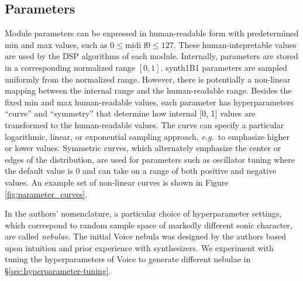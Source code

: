 \subsection{Parameters}
Module parameters can be expressed in human-readable form with predetermined min and max values, such as $0 \le \textrm{midi f0} \le 127$. These human-intepretable values are used by the DSP algorithms of each module.
Internally, parameters are stored in a corresponding normalized range $[0, 1]$. synth1B1 parameters are sampled uniformly from the normalized range. However, there is potentially a non-linear mapping between the internal range and the human-readable range. Besides the fixed min and max human-readable values, each parameter has hyperparameters ``curve'' and ``symmetry'' that determine how internal [0, 1] values are transformed to the human-readable values. The curve can specify a particular logarithmic, linear, or exponential sampling approach, {\em e.g.}\ to emphasize higher or lower values. Symmetric curves, which alternately emphasize the center or edges of the distribution, are used for parameters such as oscillator tuning where the default value is 0 and can take on a range of both positive and negative values. An example set of non-linear curves is shown in Figure \ref{fig:parameter_curves}.

In the authors' nomenclature, a particular choice of hyperparameter settings, which correspond to random sample space of markedly different sonic character, are called {\em nebulae}. The initial Voice nebula was designed by the authors based upon intuition and prior experience with synthesizers. We experiment with tuning the hyperparameters of Voice to generate different nebulae in \S\ref{sec:hyperparameter-tuning}.








